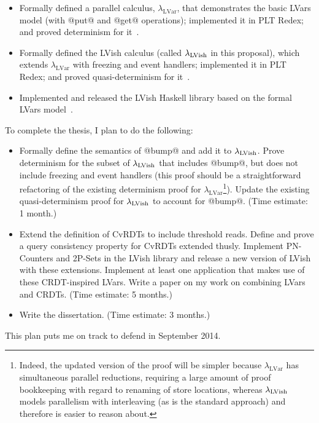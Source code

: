 \documentclass{article}
\begin{document}
\begin{itemize}
  \item Formally defined a parallel calculus,
    $\lambda_{\textrm{LVar}}$, that demonstrates the basic LVars model
    (with @put@ and @get@ operations); implemented it in PLT Redex;
    and proved determinism for it~\cite{LVars-paper, LVars-TR}.

  \item Formally defined the LVish calculus (called $\lambda_{\textrm{LVish}}$ in
    this proposal), which extends $\lambda_{\textrm{LVar}}$ with
    freezing and event handlers; implemented it in PLT Redex; and
    proved quasi-determinism for it~\cite{Freeze-paper, Freeze-TR}.

  \item Implemented and released the LVish Haskell library based on
    the formal LVars model~\cite{Freeze-paper}.
\end{itemize}
To complete the thesis, I plan to do the following:
\begin{itemize}
\item Formally define the semantics of @bump@ and add it to
  $\lambda_{\textrm{LVish}}$.  Prove determinism for the subset of $\lambda_{\textrm{LVish}}$
  that includes @bump@, but does not include freezing and event
  handlers (this proof should be a straightforward refactoring of the
  existing determinism proof for
  $\lambda_{\textrm{LVar}}$\footnote{Indeed, the updated version of
    the proof will be simpler because $\lambda_{\textrm{LVar}}$ has
    simultaneous parallel reductions, requiring a large amount of
    proof bookkeeping with regard to renaming of store locations,
    whereas $\lambda_{\textrm{LVish}}$ models parallelism with interleaving (as is
    the standard approach) and therefore is easier to reason about.}).
  Update the existing quasi-determinism proof for $\lambda_{\textrm{LVish}}$ to
  account for @bump@.  (Time estimate: 1 month.)

\item Extend the definition of CvRDTs to include threshold reads.
  Define and prove a query consistency property for CvRDTs extended
  thusly.  Implement PN-Counters and 2P-Sets in the LVish library and
  release a new version of LVish with these extensions.  Implement at
  least one application that makes use of these CRDT-inspired LVars.
  Write a paper on my work on combining LVars and CRDTs.  (Time
  estimate: 5 months.)

\item Write the dissertation. (Time estimate: 3 months.)
\end{itemize}
This plan puts me on track to defend in September 2014.



\end{document}
